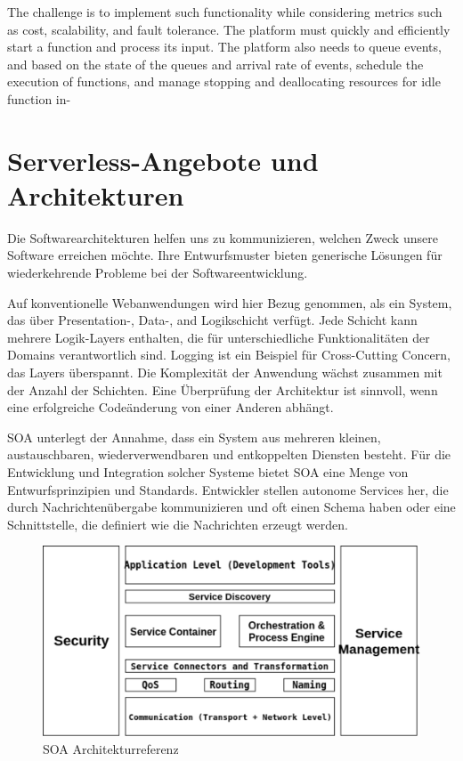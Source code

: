 \documentclass[
12pt,
english,
ngerman,
headsepline,
twoside,
openright,
numbers=noenddot,version=first
]{scrreprt}
\begin{document}
The challenge is to implement such functionality while considering metrics such
as cost, scalability, and fault tolerance. The platform must quickly and efficiently
start a function and process its input. The platform also needs to queue events, and
based on the state of the queues and arrival rate of events, schedule the execution
of functions, and manage stopping and deallocating resources for idle function in-

\chapter{Serverless-Angebote und Architekturen}

Die Softwarearchitekturen helfen uns zu kommunizieren, welchen Zweck unsere Software erreichen möchte. Ihre Entwurfsmuster bieten generische Lösungen für wiederkehrende Probleme bei der Softwareentwicklung.


Auf konventionelle Webanwendungen wird hier Bezug genommen, als ein System, das über Presentation-, Data-, and Logikschicht verfügt. Jede Schicht kann mehrere Logik-Layers enthalten, die für unterschiedliche Funktionalitäten der Domains verantwortlich sind. Logging ist ein Beispiel für Cross-Cutting Concern, das Layers überspannt. Die Komplexität der Anwendung wächst zusammen mit der Anzahl der Schichten.
Eine Überprüfung der Architektur ist sinnvoll, wenn eine erfolgreiche Codeänderung von einer Anderen abhängt.

\acrfull{SOA}
\label{sec:soa} unterlegt der Annahme, dass ein System aus mehreren kleinen, austauschbaren, wiederverwendbaren und entkoppelten Diensten besteht. Für die Entwicklung und Integration solcher Systeme bietet \acrshort{SOA} eine Menge von Entwurfsprinzipien und Standards. Entwickler stellen autonome Services her, die durch Nachrichtenübergabe kommunizieren und oft einen Schema haben oder eine Schnittstelle, die definiert wie die Nachrichten erzeugt werden.\cite{cloudEssentials}

\begin{figure}[H]
	\centering	
	\includegraphics[scale=0.80]{./pics/arch-soa.eps}
	\caption{SOA Architekturreferenz\cite{archSoa}}
	\label{pic:arch-soa}
\end{figure}
\end{document}
